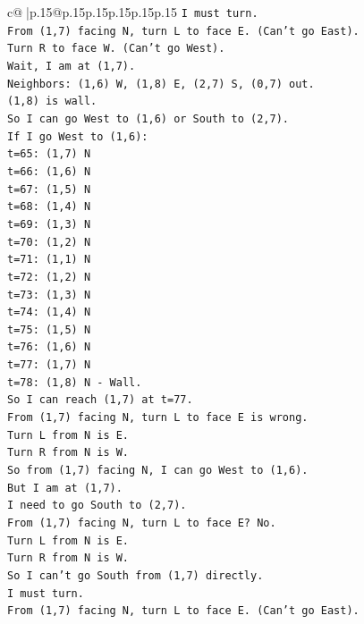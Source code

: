 \documentclass{article}
\begin{document}
{\begin{supertabular}{c@{$\;$}|p{.15\linewidth}@{}p{.15\linewidth}p{.15\linewidth}p{.15\linewidth}p{.15\linewidth}p{.15\linewidth}}
{{{\texttt{I must turn.} \\
\texttt{From (1,7) facing N, turn L to face E. (Can't go East).} \\
\texttt{Turn R to face W. (Can't go West).} \\
\texttt{Wait, I am at (1,7).} \\
\texttt{Neighbors: (1,6) W, (1,8) E, (2,7) S, (0,7) out.} \\
\texttt{(1,8) is wall.} \\
\texttt{So I can go West to (1,6) or South to (2,7).} \\
\texttt{If I go West to (1,6):} \\
\texttt{t=65: (1,7) N} \\
\texttt{t=66: (1,6) N} \\
\texttt{t=67: (1,5) N} \\
\texttt{t=68: (1,4) N} \\
\texttt{t=69: (1,3) N} \\
\texttt{t=70: (1,2) N} \\
\texttt{t=71: (1,1) N} \\
\texttt{t=72: (1,2) N} \\
\texttt{t=73: (1,3) N} \\
\texttt{t=74: (1,4) N} \\
\texttt{t=75: (1,5) N} \\
\texttt{t=76: (1,6) N} \\
\texttt{t=77: (1,7) N} \\
\texttt{t=78: (1,8) N {-} Wall.} \\
\texttt{So I can reach (1,7) at t=77.} \\
\texttt{From (1,7) facing N, turn L to face E is wrong.} \\
\texttt{Turn L from N is E.} \\
\texttt{Turn R from N is W.} \\
\texttt{So from (1,7) facing N, I can go West to (1,6).} \\
\texttt{But I am at (1,7).} \\
\texttt{I need to go South to (2,7).} \\
\texttt{From (1,7) facing N, turn L to face E? No.} \\
\texttt{Turn L from N is E.} \\
\texttt{Turn R from N is W.} \\
\texttt{So I can't go South from (1,7) directly.} \\
\texttt{I must turn.} \\
\texttt{From (1,7) facing N, turn L to face E. (Can't go East).} \\
}}}
\end{supertabular}}
\end{document}
